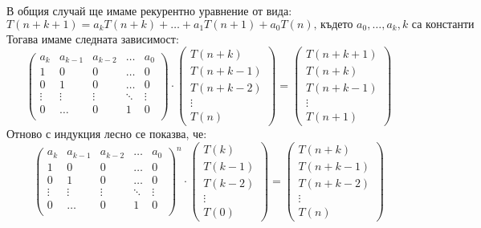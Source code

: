 \documentclass{article}
\theoremstyle{definition}
\theoremstyle{plain}
\theoremstyle{remark}
\theoremstyle{definition}
\begin{document}
В общия случай ще имаме рекурентно уравнение от вида:
\[
    T(n + k + 1) = a_k T(n + k) + \dots + a_1 T(n + 1) + a_0 T(n) \text{, където } a_0, \dots, a_k, k \text{ са константи}
\]
Тогава имаме следната зависимост:
\[
    \begin{pmatrix}
        a_k    & a_{k - 1} & a_{k - 2} & \dots  & a_0    \\
        1      & 0         & 0         & \dots  & 0      \\
        0      & 1         & 0         & \dots  & 0      \\
        \vdots & \vdots    & \vdots    & \ddots & \vdots \\
        0      & \dots     & 0         & 1      & 0      \\
    \end{pmatrix}
    \cdot
    \begin{pmatrix}
        T(n + k)     \\
        T(n + k - 1) \\
        T(n + k - 2) \\
        \vdots       \\
        T(n)
    \end{pmatrix}
    =
    \begin{pmatrix}
        T(n + k + 1) \\
        T(n + k)     \\
        T(n + k - 1) \\
        \vdots       \\
        T(n + 1)
    \end{pmatrix}
\]
Отново с индукция лесно се показва, че:
\[
    \begin{pmatrix}
        a_k    & a_{k - 1} & a_{k - 2} & \dots  & a_0    \\
        1      & 0         & 0         & \dots  & 0      \\
        0      & 1         & 0         & \dots  & 0      \\
        \vdots & \vdots    & \vdots    & \ddots & \vdots \\
        0      & \dots     & 0         & 1      & 0      \\
    \end{pmatrix}^n
    \cdot
    \begin{pmatrix}
        T(k)     \\
        T(k - 1) \\
        T(k - 2) \\
        \vdots   \\
        T(0)
    \end{pmatrix}
    =
    \begin{pmatrix}
        T(n + k)     \\
        T(n + k - 1) \\
        T(n + k - 2) \\
        \vdots       \\
        T(n)
    \end{pmatrix}
\]
\end{document}
